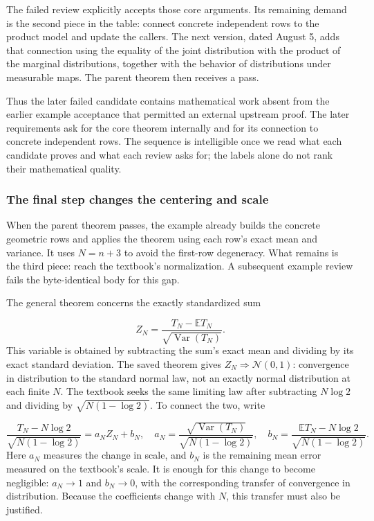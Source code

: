 The failed review explicitly accepts those core arguments. Its remaining demand is the second piece in the table: connect concrete independent rows to the product model and update the callers. The next version, dated August 5, adds that connection using the equality of the joint distribution with the product of the marginal distributions, together with the behavior of distributions under measurable maps. The parent theorem then receives a pass.

Thus the later failed candidate contains mathematical work absent from the earlier example acceptance that permitted an external upstream proof. The later requirements ask for the core theorem internally and for its connection to concrete independent rows. The sequence is intelligible once we read what each candidate proves and what each review asks for; the labels alone do not rank their mathematical quality.

\subsubsection[The final step changes the centering and scale]{\texorpdfstring{\protect\hypertarget{l3-5}{}The final step changes the centering and scale}{The final step changes the centering and scale}}
When the parent theorem passes, the example already builds the concrete geometric rows and applies the theorem using each row's exact mean and variance. It uses $N=n+3$ to avoid the first-row degeneracy. What remains is the third piece: reach the textbook's normalization. A subsequent example review fails the byte-identical body for this gap.

The general theorem concerns the exactly standardized sum

\[
Z_N=\frac{T_N-\mathbb E T_N}{\sqrt{\operatorname{Var}(T_N)}}.
\]
This variable is obtained by subtracting the sum's exact mean and dividing by its exact standard deviation. The saved theorem gives $Z_N\Rightarrow\mathcal N(0,1)$: convergence in distribution to the standard normal law, not an exactly normal distribution at each finite $N$. The textbook seeks the same limiting law after subtracting $N\log2$ and dividing by $\sqrt{N(1-\log2)}$. To connect the two, write

\[
\frac{T_N-N\log 2}{\sqrt{N(1-\log 2)}}=a_N Z_N+b_N,
\quad
a_N=\frac{\sqrt{\operatorname{Var}(T_N)}}{\sqrt{N(1-\log 2)}},
\quad
b_N=\frac{\mathbb E T_N-N\log 2}{\sqrt{N(1-\log 2)}}.
\]
Here $a_N$ measures the change in scale, and $b_N$ is the remaining mean error measured on the textbook's scale. It is enough for this change to become negligible: $a_N\to1$ and $b_N\to0$, with the corresponding transfer of convergence in distribution. Because the coefficients change with $N$, this transfer must also be justified.

